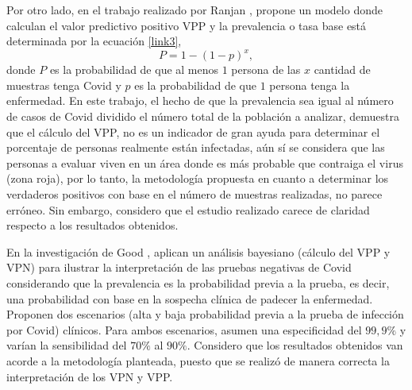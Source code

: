 \documentclass{article}
\begin{document}
Por otro lado, en el trabajo realizado por Ranjan \cite{link3}, propone un modelo donde calculan el valor predictivo positivo VPP y la prevalencia o tasa base está determinada por la ecuación \ref{link3},
\begin{equation}
P= 1-(1-p)^x,
\label{link3}
\end{equation}
\noindent donde $P$ es la probabilidad de que al menos $1$ persona de las $x$ cantidad de muestras tenga Covid y $p$ es la probabilidad de que $1$ persona tenga la enfermedad. En este trabajo, el hecho de que la prevalencia sea igual al número de casos de Covid dividido el número total de la población a analizar, demuestra que el cálculo del VPP, no es un indicador de gran ayuda para determinar el porcentaje de personas realmente están infectadas, aún sí se considera que las personas a evaluar viven en un área donde es más probable que contraiga el virus (zona roja), por lo tanto, la metodología propuesta en cuanto a determinar los verdaderos positivos con base en el número de muestras realizadas, no parece erróneo. Sin embargo, considero que el estudio realizado carece de claridad respecto a los resultados obtenidos.

En la investigación de Good \cite{link4}, aplican un análisis bayesiano (cálculo del VPP y VPN) para ilustrar la interpretación de las pruebas negativas de Covid considerando que la prevalencia es la probabilidad previa a la prueba, es decir, una probabilidad con base en la sospecha clínica de padecer la enfermedad. Proponen dos escenarios (alta y baja probabilidad previa a la prueba de infección por Covid) clínicos. Para ambos escenarios, asumen una especificidad del $99,9\%$ y varían la sensibilidad del $70\%$ al $90\%$. Considero que los resultados obtenidos van acorde a la metodología planteada, puesto que se realizó de manera correcta la interpretación de los VPN y VPP.
\end{document}
